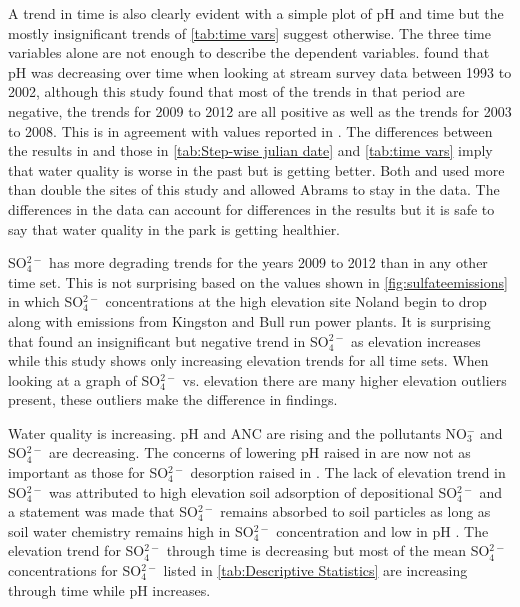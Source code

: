 A trend in time is also clearly evident with a simple plot of pH and time but the mostly insignificant trends of \autoref{tab:time vars} suggest otherwise. The three time variables alone are not enough to describe the dependent variables.  \citet{robinson2008ph} found that pH was decreasing over time when looking at stream survey data between 1993 to 2002, although this study found that most of the trends in that period are negative, the trends for 2009 to 2012 are all positive as well as the trends for 2003 to 2008.  This is in agreement with values reported in \citet{cai2012}.  The differences between the results in \citet{robinson2008ph} and those in \autoref{tab:Step-wise julian date} and \autoref{tab:time vars} imply that water quality is worse in the past but is getting better.  Both \citet{robinson2008ph} and \citet{cai2012} used more than double the sites of this study and \citet{robinson2008ph} allowed Abrams to stay in the data.  The differences in the data can account for differences in the results but it is safe to say that water quality in the park is getting healthier.

SO$_4^{2-}$ has more degrading trends for the years 2009 to 2012 than in any other time set. This is not surprising based on the values shown in \autoref{fig:sulfateemissions} in which SO$_4^{2-}$ concentrations at the high elevation site Noland begin to drop along with emissions from Kingston and Bull run power plants.  It is surprising that \cite{cai2012} found an insignificant but negative trend in SO$_4^{2-}$ as elevation increases while this study shows only increasing elevation trends for all time sets.  When looking at a graph of SO$_4^{2-}$ vs. elevation there are many higher elevation outliers present, these outliers make the difference in findings.%

Water quality is increasing.  pH and ANC are rising and the pollutants NO$_3^-$ and SO$_4^{2-}$ are decreasing.  The concerns of lowering pH raised in \citet{robinson2008ph} are now not as important as those for SO$_4^{2-}$ desorption raised in \citet{cai2012}.  The lack of elevation trend in SO$_4^{2-}$ was attributed to high elevation soil adsorption of depositional SO$_4^{2-}$ and a statement was made that SO$_4^{2-}$ remains absorbed to soil particles as long as soil water chemistry remains high in SO$_4^{2-}$ concentration and low in pH \citep{cai2011long}.  The elevation trend for SO$_4^{2-}$ through time is decreasing but most of the mean SO$_4^{2-}$ concentrations for SO$_4^{2-}$  listed in \autoref{tab:Descriptive Statistics} are increasing through time while pH increases.

